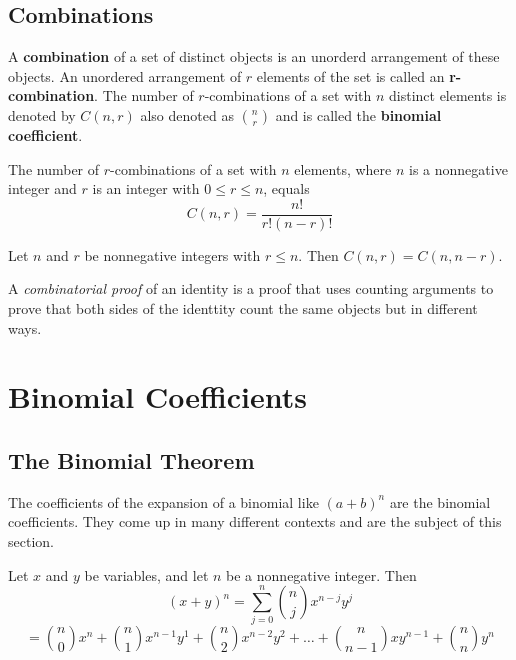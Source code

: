     \subsection {Combinations}
\begin{definition}
A \textbf{combination} of a set of distinct objects is an unorderd arrangement of these objects. An unordered arrangement of $r$ elements of the set is called an \textbf{r-combination}. The number of $r$-combinations of a set with $n$ distinct elements is denoted by $C(n,r)$ also denoted as $n\choose{r}$ and is called the \textbf{binomial coefficient}.
\end{definition}

\begin{theorem}
The number of $r$-combinations of a set with $n$ elements, where $n$ is a nonnegative integer and $r$ is an integer with $0 \le r \le n$, equals
$$C(n,r)=\frac{n!}{r!(n-r)!}$$
\end{theorem}

\begin{corollary}
Let $n$ and $r$ be nonnegative integers with $r \le n$. Then $C(n,r)=C(n,n-r)$.
\end{corollary}

\begin{definition}
A \textit{combinatorial proof} of an identity is a proof that uses counting arguments to prove that both sides of the identtity count the same objects but in different ways.
\end{definition}

\section {Binomial Coefficients}
    \subsection {The Binomial Theorem}
The coefficients of the expansion of a binomial like $(a+b)^n$ are the binomial coefficients. They come up in many different contexts and are the subject of this section.

\begin{theorem}
Let $x$ and $y$ be variables, and let $n$ be a nonnegative integer. Then 
$${(x+y)^n} ={ \sum_{j=0}^n}   {{ n} \choose{j}} x^{n-j}y^j$$
$$= {n \choose {0}}  {x^n}   +  
{n \choose 1      }   {x^{n-1}y^1}   +   
{n \choose 2      }   {x^{n-2}y^2} + 
\dots +
{n \choose {n-1}}   {xy^{n-1}} + 
{n \choose n      }    { y^n}$$
\end{theorem}


